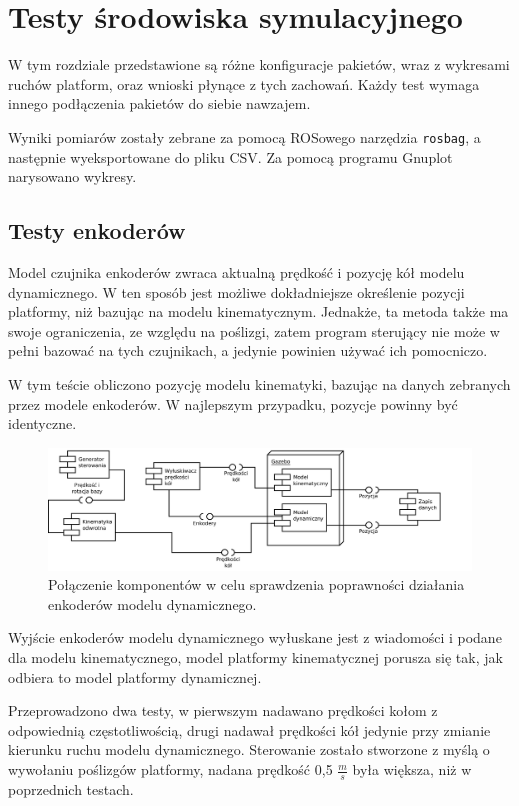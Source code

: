 \chapter{Testy środowiska symulacyjnego}
\label{sec:tests}
W tym rozdziale przedstawione są różne konfiguracje pakietów, wraz z wykresami ruchów platform, oraz wnioski płynące z tych zachowań.
Każdy test wymaga innego podłączenia pakietów do siebie nawzajem.

Wyniki pomiarów zostały zebrane za pomocą ROSowego narzędzia \texttt{rosbag}, a następnie wyeksportowane do pliku CSV. Za pomocą programu Gnuplot narysowano wykresy.

\section{Testy enkoderów}
	Model czujnika enkoderów zwraca aktualną prędkość i pozycję kół modelu dynamicznego.
	W ten sposób jest możliwe dokładniejsze określenie pozycji platformy, niż bazując na modelu kinematycznym.
	Jednakże, ta metoda także ma swoje ograniczenia, ze względu na poślizgi, zatem program sterujący nie może w pełni bazować na tych czujnikach, a jedynie powinien używać ich pomocniczo.
	
	W tym teście obliczono pozycję modelu kinematyki, bazując na danych zebranych przez modele enkoderów.
	W najlepszym przypadku, pozycje powinny być identyczne.
	
	\begin{figure}[H]
		\centering
		\includegraphics[width=\textwidth]{uml/encoders.pdf}
			\caption{Połączenie komponentów w celu sprawdzenia poprawności działania enkoderów modelu dynamicznego.}
		\label{plot:encoders}
	\end{figure}
	
	Wyjście enkoderów modelu dynamicznego wyłuskane jest z wiadomości i podane dla modelu kinematycznego, model platformy kinematycznej porusza się tak, jak odbiera to model platformy dynamicznej. 
	
	Przeprowadzono dwa testy, w pierwszym nadawano prędkości kołom z odpowiednią częstotliwością, drugi nadawał prędkości kół jedynie przy zmianie kierunku ruchu modelu dynamicznego.
	Sterowanie zostało stworzone z myślą o wywołaniu poślizgów platformy, nadana prędkość 0,5 $\frac{m}{s}$ była większa, niż w poprzednich testach.
	
